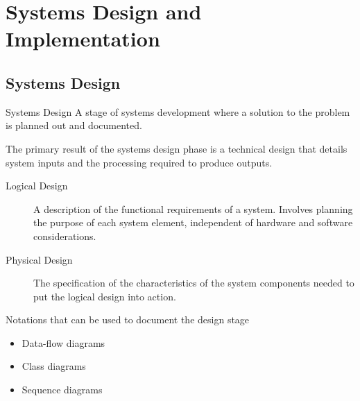 \documentclass[\main/notes.tex]{subfiles}
\begin{document}
	\setcounter{chapter}{11}
	\chapter{Systems Design and Implementation}
		\section{Systems Design}
			\begin{definition}{Systems Design}
				A stage of systems development where a solution to the problem is planned out and documented.

				The primary result of the systems design phase is a technical design that details system inputs and the processing required to produce outputs.

				\begin{indentparagraph}
					\begin{description}
						\item[Logical Design] A description of the functional requirements of a system. Involves planning the purpose of each system element, independent of hardware and software considerations.
						\item[Physical Design] The specification of the characteristics of the system components needed to put the logical design into action.
					\end{description}
				\end{indentparagraph}
			\end{definition}
			\begin{sidenote}{Notations that can be used to document the design stage}
				\begin{multicols}{2}
					\begin{itemize}[nosep]
						\item Data-flow diagrams
						\item Class diagrams
						\item Sequence diagrams
					\end{itemize}
				\end{multicols}
			\end{sidenote}
\end{document}
